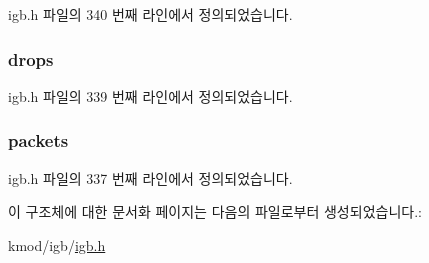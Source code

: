 igb.\+h 파일의 340 번째 라인에서 정의되었습니다.

\subsubsection[{\texorpdfstring{drops}{drops}}]{ drops}\hypertarget{structigb__rx__queue__stats_a0e7ed04a01d0914efb49e588a8c49ea8}{}\label{structigb__rx__queue__stats_a0e7ed04a01d0914efb49e588a8c49ea8}


igb.\+h 파일의 339 번째 라인에서 정의되었습니다.

\subsubsection[{\texorpdfstring{packets}{packets}}]{ packets}\hypertarget{structigb__rx__queue__stats_ae5fef1d76642baa9a22fafc8c04907c5}{}\label{structigb__rx__queue__stats_ae5fef1d76642baa9a22fafc8c04907c5}


igb.\+h 파일의 337 번째 라인에서 정의되었습니다.



이 구조체에 대한 문서화 페이지는 다음의 파일로부터 생성되었습니다.\+:\begin{DoxyCompactItemize}
\item 
kmod/igb/\hyperlink{kmod_2igb_2igb_8h}{igb.\+h}\end{DoxyCompactItemize}
